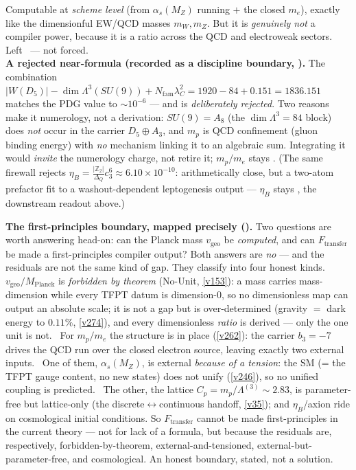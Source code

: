 \documentclass[11pt,a4paper]{article}
\newcommand{\cthree}{c_3}
\newcommand{\Nfam}{N_{\mathrm{fam}}}
\newcommand{\Z}{\mathbb{Z}}
\begin{document}
\begin{keybox}
Computable at \emph{scheme level} (from $\alpha_s(M_Z)$ running $+$ the closed $m_e$), exactly like the
dimensionful EW/QCD masses $m_W,m_Z$. But it is \emph{genuinely not} a compiler power, because it is a
ratio across the QCD and electroweak sectors. Left \mO\ --- not forced.
\smallskip\\
\noindent\textbf{A rejected near-formula (recorded as a discipline boundary, ).}
The combination $|W(D_5)|-\dim\Lambda^3(SU(9))+\Nfam\lambda_C^2=1920-84+0.151=1836.151$ matches the PDG value to
$\sim10^{-6}$ --- and is \emph{deliberately rejected}. Two reasons make it numerology, not a derivation:
$SU(9)=A_8$ (the $\dim\Lambda^3=84$ block) does \emph{not} occur in the carrier $D_5\oplus A_3$, and $m_p$ is
QCD confinement (gluon binding energy) with \emph{no} mechanism linking it to an algebraic sum. Integrating it
would \emph{invite} the numerology charge, not retire it; $m_p/m_e$ stays \mO. (The same firewall rejects
$\eta_B=\tfrac{|\Z_2|}{\Delta_Q}\cthree^6\approx6.10\times10^{-10}$: arithmetically close, but a two-atom
prefactor fit to a washout-dependent leptogenesis output --- $\eta_B$ stays \mC, the downstream readout above.)
\end{keybox}

\par\smallskip\noindent\textbf{The first-principles boundary, mapped precisely ().}
Two questions are worth answering head-on: can the Planck mass $v_{\mathrm{geo}}$ be \emph{computed}, and can
$F_{\mathrm{transfer}}$ be made a first-principles compiler output? Both answers are \emph{no} --- and the
residuals are not the same kind of gap. They classify into four honest kinds. \mE\ $v_{\mathrm{geo}}/M_{\mathrm{Planck}}$
is \emph{forbidden by theorem} (No-Unit, \vref{v153}): a mass carries mass-dimension while every TFPT datum is
dimension-$0$, so no dimensionless map can output an absolute scale; it is not a gap but is over-determined (gravity
$=$ dark energy to $0.11\%$, \vref{v274}), and every dimensionless \emph{ratio} is derived --- only the one unit is
not. \mE\ For $m_p/m_e$ the structure is in place (\vref{v262}): the carrier $b_3{=}{-}7$ drives the QCD run over the
closed electron source, leaving exactly two external inputs. \mX\ One of them, $\alpha_s(M_Z)$, is external
\emph{because of a tension}: the SM (= the TFPT gauge content, no new states) does not unify (\vref{v246}), so no
unified coupling is predicted. \mC\ The other, the lattice $C_p=m_p/\Lambda^{(3)}\!\sim\!2.83$, is parameter-free
but lattice-only (the discrete$\leftrightarrow$continuous handoff, \vref{v35}); and $\eta_B$/axion ride on
cosmological initial conditions. So $F_{\mathrm{transfer}}$ cannot be made first-principles in the current theory ---
not for lack of a formula, but because the residuals are, respectively, forbidden-by-theorem, external-and-tensioned,
external-but-parameter-free, and cosmological. An honest boundary, stated, not a solution.
\end{document}
